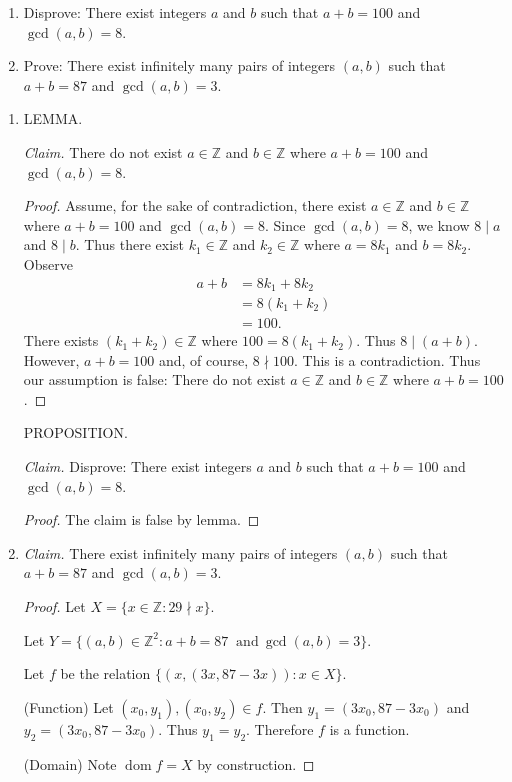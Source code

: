 \documentclass{article}
\newcommand{\Z}{\mathbb{Z}}
\DeclareMathOperator{\dom}{dom}
\theoremstyle{definition}
\begin{document}
\begin{question}
    \begin{enumerate}
        \item Disprove: There exist integers $a$ and $b$ such that $a+b=100$ and $\gcd(a, b)=8$.
        \item Prove: There exist infinitely many pairs of integers $(a,b)$ such that $a+b=87$ and $\gcd(a, b)=3$.
    \end{enumerate}
\end{question}
\begin{solution}
\begin{enumerate}
\item\small{LEMMA.}

\textit{Claim. }There do not exist $a\in\Z$ and $b\in\Z$ where $a+b=100$ and $\gcd(a,b)=8$.
\begin{proof}
Assume, for the sake of contradiction, there exist $a\in\Z$ and $b\in\Z$ where $a+b=100$ and $\gcd(a,b)=8$. Since $\gcd(a,b)=8$, we know $8\mid a$ and $8\mid b$. Thus there exist $k_1\in\Z$ and $k_2\in\Z$ where $a=8k_1$ and $b=8k_2$. Observe
\begin{align*}
a+b
&=8k_1+8k_2\\
&=8(k_1+k_2)\\
&=100.
\end{align*}
There exists $(k_1+k_2)\in\Z$ where $100=8(k_1+k_2)$. Thus $8\mid(a+b)$. However, $a+b=100$ and, of course, $8\nmid 100$. This is a contradiction. Thus our assumption is false: There do not exist $a\in\Z$ and $b\in\Z$ where $a+b=100$.
\end{proof}
\small{PROPOSITION.}

\textit{Claim. }Disprove: There exist integers $a$ and $b$ such that $a+b=100$ and $\gcd(a,b)=8$.
\begin{proof}
The claim is false by lemma.
\end{proof}
\item\textit{Claim. }There exist infinitely many pairs of integers $(a,b)$ such that $a+b=87$ and $\gcd(a, b)=3$.
\begin{proof}
Let $X=\{x\in\Z:29\nmid x\}$.

Let $Y=\{(a,b)\in\Z^2:a+b=87~\text{ and}~\gcd(a,b)=3\}$.

Let $f$ be the relation $\{(x,(3x,87-3x)):x\in X\}$.

(Function) Let $(x_0,y_1),(x_0,y_2)\in f$. Then $y_1=(3x_0,87-3x_0)$ and $y_2=(3x_0,87-3x_0)$. Thus $y_1=y_2$. Therefore $f$ is a function.

(Domain) Note $\dom{f}=X$ by construction.


\end{proof}
\end{enumerate}
\end{solution}
\end{document}

